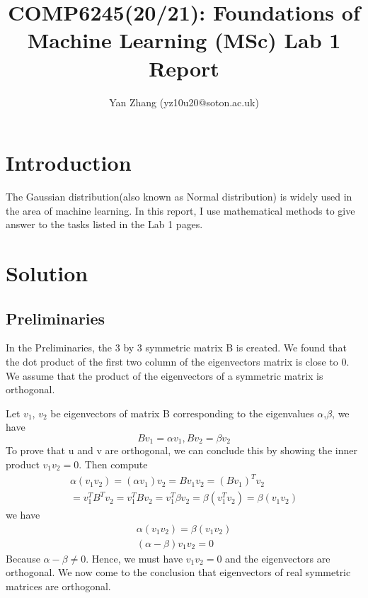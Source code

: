 \documentclass[10pt]{article}
\begin{document}
 

\title{\huge{COMP6245(20/21): Foundations of Machine Learning (MSc) Lab 1 Report}}
\author{\normalsize{Yan Zhang (yz10u20@soton.ac.uk)}}
\date{}
\maketitle


\section{Introduction}

The Gaussian distribution(also known as Normal distribution) is widely used in the area of machine learning. In this report, I use mathematical methods to give answer to the tasks listed in the Lab 1 pages. 

\section{Solution}
\subsection{Preliminaries}
In the Preliminaries, the 3 by 3 symmetric matrix B is created. We found that the dot product of the first two column of the eigenvectors matrix is close to 0. We assume that the product of the eigenvectors of a symmetric matrix is orthogonal. 

Let $v_{1}$, $v_{2}$ be eigenvectors of matrix B corresponding to the eigenvalues $\alpha$,$\beta$, 
we have
\begin{equation}
   Bv_{1} = {\alpha}v_{1}, Bv_{2} = {\beta}v_{2}
\end{equation}
To prove that u and v are orthogonal, we can conclude this by showing the inner product $v_{1}v_{2}=0$. Then compute
\begin{equation}
\begin{aligned}
{\alpha}(v_{1}v_{2}) = ({\alpha}v_{1})v_{2}
  = Bv_{1}v_{2} = (Bv_{1})^{T}v_{2}\\
  = v_{1}^{T}B^{T}v_{2} = v_{1}^{T}Bv_{2}
  = v_{1}^{T}{\beta}v_{2} = {\beta}(v_{1}^{T}v_{2})
  = {\beta}(v_{1}v_{2})
\end{aligned}
\end{equation}
we have 
\begin{equation}
\begin{aligned}
    {\alpha}(v_{1}v_{2}) = {\beta}(v_{1}v_{2})\\
    ({\alpha}-{\beta})v_{1}v_{2} = 0
\end{aligned}
\end{equation}
Because ${\alpha}-{\beta}\neq0$. Hence, we must have $v_{1}v_{2}=0$ and the eigenvectors are orthogonal. We now come to the conclusion that eigenvectors of real symmetric matrices are orthogonal. 
\end{document}
